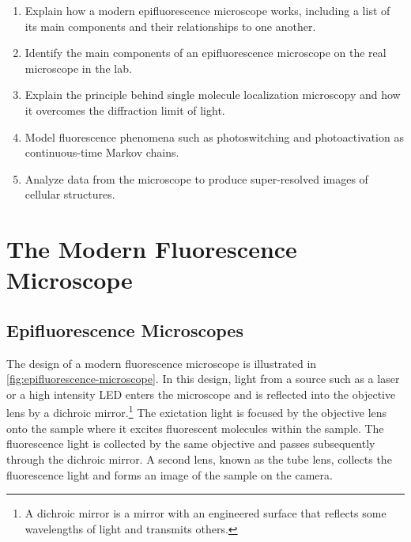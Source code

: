 \documentclass[10pt,a4paper]{book}
\begin{document}
\begin{enumerate}
    \item Explain how a modern epifluorescence microscope works, including a list of its main components and their relationships to one another.
    \item Identify the main components of an epifluorescence microscope on the real microscope in the lab.
    \item Explain the principle behind single molecule localization microscopy and how it overcomes the diffraction limit of light.
    \item Model fluorescence phenomena such as photoswitching and photoactivation as continuous-time Markov chains.
    \item Analyze data from the microscope to produce super-resolved images of cellular structures.
\end{enumerate}

\chapter{The Modern Fluorescence Microscope} \label{ch:microscopes}

\section{Epifluorescence Microscopes}

The design of a modern fluorescence microscope is illustrated in \autoref{fig:epifluorescence-microscope}. In this design, light from a source such as a laser or a high intensity LED enters the microscope and is reflected into the objective lens by a dichroic mirror.\footnote{A dichroic mirror is a mirror with an engineered surface that reflects some wavelengths of light and transmits others.} The exictation light is focused by the objective lens onto the sample where it excites fluorescent molecules within the sample. The fluorescence light is collected by the same objective and passes subsequently through the dichroic mirror. A second lens, known as the tube lens, collects the fluorescence light and forms an image of the sample on the camera.
\end{document}
